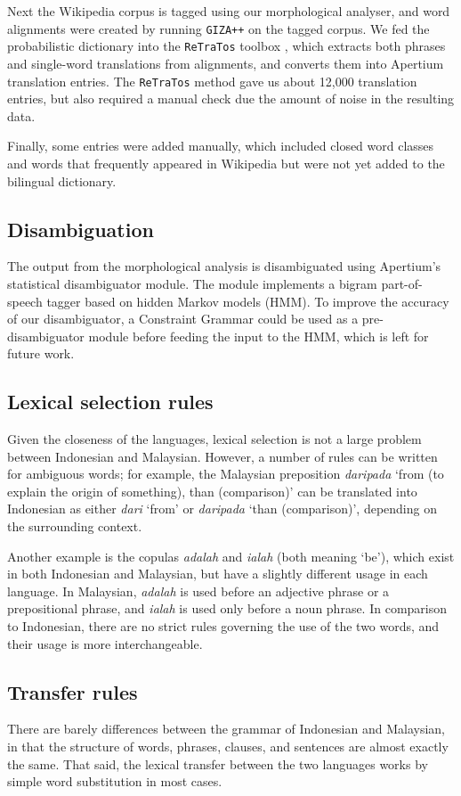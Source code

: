 \documentclass[10pt,a5paper,twoside]{article}
\begin{document}
Next the Wikipedia corpus is tagged using our morphological analyser, and word alignments were created by running \texttt{GIZA++} \citep{Och2003align} on the tagged corpus. We fed the probabilistic dictionary into the \texttt{ReTraTos} toolbox \citep{Caseli2006retratos}, which extracts both phrases and single-word translations from alignments, and converts them into Apertium translation entries. The \texttt{ReTraTos} method gave us about 12,000 translation entries, but also required a manual check due the amount of noise in the resulting data.

Finally, some entries were added manually, which included closed word classes and words that frequently appeared in Wikipedia but were not yet added to the bilingual dictionary.

\subsection{Disambiguation}
The output from the morphological analysis is disambiguated using Apertium's statistical disambiguator module. The module implements a bigram part-of-speech tagger based on hidden Markov models (HMM). To improve the accuracy of our disambiguator, a Constraint Grammar \citep{Karlsson1990cg} could be used as a pre-disambiguator module before feeding the input to the HMM, which is left for future work.

\subsection{Lexical selection rules}
Given the closeness of the languages, lexical selection is not a large problem between Indonesian and Malaysian. However, a number of rules can be written for ambiguous words; for example, the Malaysian preposition \emph{daripada} `from (to explain the origin of something), than (comparison)' can be translated into Indonesian as either \emph{dari} `from' or \emph{daripada} `than (comparison)', depending on the surrounding context.

Another example is the copulas \emph{adalah} and \emph{ialah} (both meaning `be'), which exist in both Indonesian and Malaysian, but have a slightly different usage in each language. In Malaysian, \emph{adalah} is used before an adjective phrase or a prepositional phrase, and \emph{ialah} is used only before a noun phrase. In comparison to Indonesian, there are no strict rules governing the use of the two words, and their usage is more interchangeable.
\subsection{Transfer rules}
There are barely differences between the grammar of Indonesian and Malaysian, in that the structure of words, phrases, clauses, and sentences are almost exactly the same. That said, the lexical transfer between the two languages works by simple word substitution in most cases.
\end{document}

